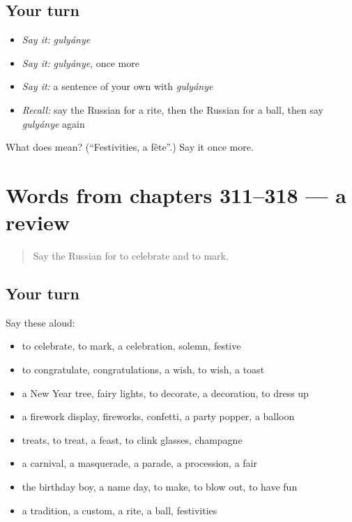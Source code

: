 \subsection*{Your turn}
\begin{itemize}
\raggedright
  \item \emph{Say it:} \emph{gulyánye}
  \item \emph{Say it:} \emph{gulyánye}, once more
  \item \emph{Say it:} a sentence of your own with \emph{gulyánye}
  \item \emph{Recall:} say the Russian for a rite, then the Russian for a ball, then say \emph{gulyánye} again
\end{itemize}

\begin{tcolorbox}[breakable,colback=teal!4,colframe=teal!35!black,title={Before you move on}]
What does  mean? (\textquotedblleft{}Festivities, a fête\textquotedblright{}.) Say it once more.
\end{tcolorbox}
\section[(dialogue)]{Words from chapters 311–318 — a review}

\label{lesson:RU-R318-review-311-318}



\begin{quote}
Say the Russian for to celebrate and to mark.
\end{quote}

\subsection*{Your turn}
Say these aloud:

\begin{itemize}
\raggedright
  \item to celebrate, to mark, a celebration, solemn, festive
  \item to congratulate, congratulations, a wish, to wish, a toast
  \item a New Year tree, fairy lights, to decorate, a decoration, to dress up
  \item a firework display, fireworks, confetti, a party popper, a balloon
  \item treats, to treat, a feast, to clink glasses, champagne
  \item a carnival, a masquerade, a parade, a procession, a fair
  \item the birthday boy, a name day, to make, to blow out, to have fun
  \item a tradition, a custom, a rite, a ball, festivities
\end{itemize}

